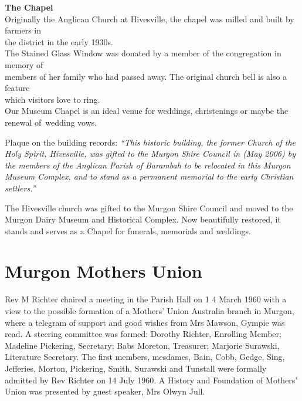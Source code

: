 \textbf{The Chapel}\\

Originally the Anglican Church at Hivesville, the chapel was milled and built by farmers in\\

the district in the early 1930s.\\

The Stained Glass Window was donated by a member of the congregation in memory of\\

members of her family who had passed away. The original church bell is also a feature\\

which visitors love to ring.\\

Our Museum Chapel is an ideal venue for weddings, christenings or maybe the renewal of~wedding vows.



Plaque on the building records: \emph{``This historic building, the former Church of the Holy Spirit, Hivesville, was gifted to the Murgon Shire Council in (May 2006) by the members of the Anglican Parish of Barambah to be relocated in this Murgon Museum Complex, and to stand as a permanent memorial to the early Christian settlers.''}





The Hivesville church was gifted to the Murgon Shire Council and moved to the Murgon Dairy Museum and Historical Complex. Now beautifully restored, it stands and serves as a Chapel for funerals, memorials and weddings.



\section{Murgon Mothers Union}



Rev M Richter chaired a meeting in the Parish Hall on 1 4 March 1960 with a view to the possible formation of a Mothers' Union Australia branch in Murgon, where a telegram of support and good wishes from Mrs Mawson, Gympie was read. A steering committee was formed: Dorothy Richter, Enrolling Member; Madeline Pickering, Secretary; Babs Moreton, Treasurer; Marjorie Surawski, Literature Secretary. The first members, mesdames, Bain, Cobb, Gedge, Sing, Jefferies, Morton, Pickering, Smith, Surawski and Tunstall were formally admitted by Rev Richter on 14 July 1960. A History and Foundation of Mothers' Union was presented by guest speaker, Mrs Olwyn Jull.



